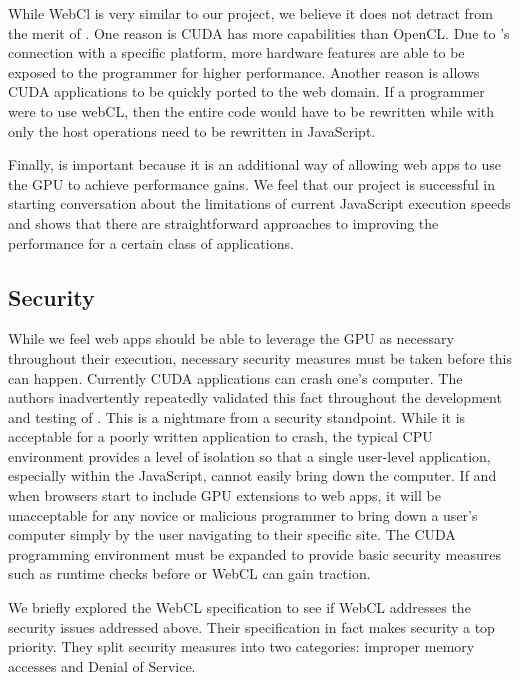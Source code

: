 While WebCl is very similar to our project, we believe it does not detract from
the merit of \namens. One reason is CUDA has more capabilities than OpenCL. Due
to \namens's connection with a specific platform, more hardware features are able to
be exposed to the programmer for higher performance. Another reason is \name
allows CUDA applications to be quickly ported to the web domain. If a programmer
were to use webCL, then the entire code would have to be rewritten while with
\name only the host operations need to be rewritten in JavaScript.

Finally, \name is
important because it is an additional way of allowing web apps to use the GPU to
achieve performance gains. We feel that our project is successful in starting
conversation about the limitations of current JavaScript execution speeds and
shows that there are straightforward approaches to improving the performance for
a certain class of applications. 



\subsection{Security}
\label{security}
While we feel web apps should be able to leverage the GPU as necessary
throughout their execution, necessary security measures must be taken before
this can happen. Currently CUDA applications can crash one's computer. The
authors inadvertently repeatedly validated this fact throughout the development and
testing of \namens. This is a nightmare from a security standpoint. While it is
acceptable for a poorly written application to crash, the typical CPU
environment provides a level of isolation so that a single user-level
application, especially within the JavaScript, cannot easily bring down the
computer. If and when browsers start to include GPU extensions to web apps, it
will be unacceptable for any novice or malicious programmer to bring down a
user's computer simply by the user navigating to their specific site. The CUDA
programming environment must be expanded to provide basic security measures such
as runtime checks before \name or WebCL can gain traction.

We briefly explored the WebCL specification to see if WebCL addresses the
security issues addressed above. Their specification in fact makes security a
top priority. They split security measures into two categories: improper memory
accesses and Denial of Service.

